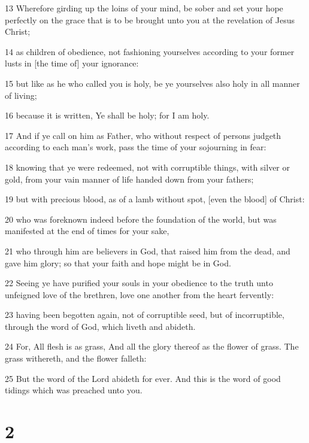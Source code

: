\par 13 Wherefore girding up the loins of your mind, be sober and set your hope perfectly on the grace that is to be brought unto you at the revelation of Jesus Christ;
\par 14 as children of obedience, not fashioning yourselves according to your former lusts in [the time of] your ignorance:
\par 15 but like as he who called you is holy, be ye yourselves also holy in all manner of living;
\par 16 because it is written, Ye shall be holy; for I am holy.
\par 17 And if ye call on him as Father, who without respect of persons judgeth according to each man's work, pass the time of your sojourning in fear:
\par 18 knowing that ye were redeemed, not with corruptible things, with silver or gold, from your vain manner of life handed down from your fathers;
\par 19 but with precious blood, as of a lamb without spot, [even the blood] of Christ:
\par 20 who was foreknown indeed before the foundation of the world, but was manifested at the end of times for your sake,
\par 21 who through him are believers in God, that raised him from the dead, and gave him glory; so that your faith and hope might be in God.
\par 22 Seeing ye have purified your souls in your obedience to the truth unto unfeigned love of the brethren, love one another from the heart fervently:
\par 23 having been begotten again, not of corruptible seed, but of incorruptible, through the word of God, which liveth and abideth.
\par 24 For, All flesh is as grass, And all the glory thereof as the flower of grass. The grass withereth, and the flower falleth:
\par 25 But the word of the Lord abideth for ever. And this is the word of good tidings which was preached unto you.

\chapter{2}

